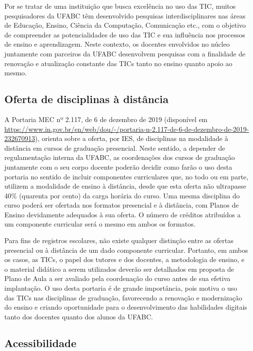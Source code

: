Por se tratar de uma instituição que busca excelência no uso das TIC, muitos
pesquisadores da UFABC têm desenvolvido pesquisas interdisciplinares nas áreas
de Educação, Ensino, Ciência da Computação, Comunicação etc., com o objetivo de
compreender as potencialidades de uso das TIC e sua influência nos processos de
ensino e aprendizagem. 
Neste contexto, os docentes envolvidos no núcleo juntamente com parceiros da
UFABC desenvolvem pesquisas com a finalidade de renovação e atualização
constante das TICs tanto no ensino quanto apoio ao mesmo.


\subsection{Oferta de disciplinas à distância}

A Portaria MEC nº 2.117, de 6 de dezembro de 2019 (disponível em
\url{https://www.in.gov.br/en/web/dou/-/portaria-n-2.117-de-6-de-dezembro-de-2019-232670913}),
orienta sobre a oferta, por IES, de disciplinas na modalidade à
distância em cursos de graduação presencial.
Neste sentido, a depender de regulamentação interna da UFABC, as coordenações dos
cursos de graduação juntamente com o seu corpo docente poderão decidir
como farão o uso desta portaria no sentido de incluir componentes
curriculares que, no todo ou em parte, utilizem a modalidade de ensino
à distância, desde que esta oferta não ultrapasse 40\% (quarenta por
cento) da carga horária do curso.  Uma mesma disciplina do curso
poderá ser ofertada nos formatos presencial e à distância, com Planos
de Ensino devidamente adequados à sua oferta.  O número de créditos
atribuídos a um componente curricular será o mesmo em ambos os
formatos.

Para fins de registros escolares, não existe qualquer distinção entre as
ofertas presencial ou à distância de um dado componente curricular.
Portanto, em ambos os casos, as TICs, o papel dos tutores e dos docentes, a
metodologia de ensino, e o material didático a serem utilizados deverão ser
detalhados em proposta de Plano de Aula a ser avaliado pela coordenação do
curso antes de sua efetiva implantação. 
O uso desta portaria é de grande importância, pois motiva o uso das TICs nas
disciplinas de graduação, favorecendo a renovação e modernização do ensino e
criando oportunidade para o desenvolvimento das habilidades digitais tanto dos
docentes quanto dos alunos da UFABC.

\subsection{Acessibilidade}

